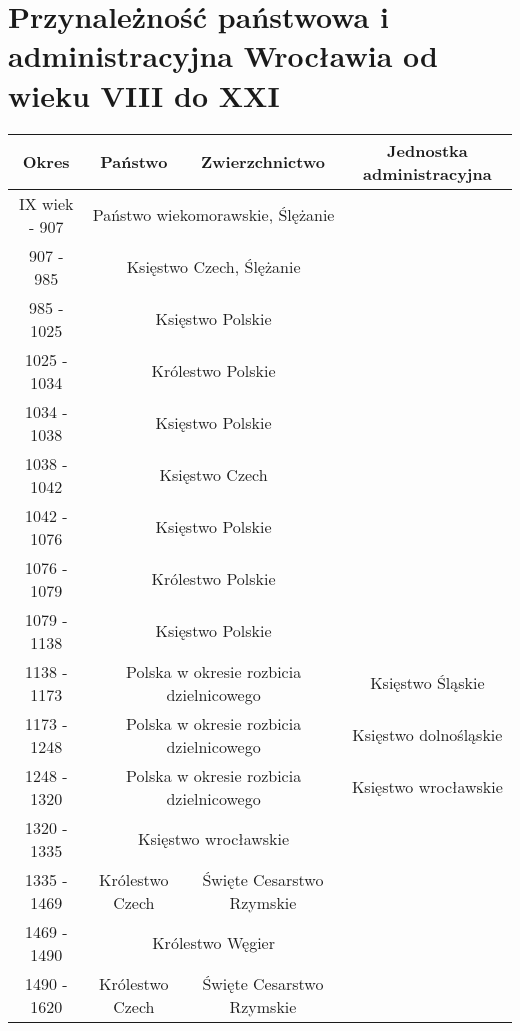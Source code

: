 \documentclass[12pt]{article}
\begin{document}
\section{Przynależność państwowa i administracyjna Wrocławia od wieku VIII do XXI}

\begin{center}
\begin{longtable}{|c|c|c|c|} 
\hline
\textbf{Okres} & \textbf{Państwo} & \textbf{Zwierzchnictwo} & \textbf{Jednostka administracyjna} \\
\hline
\cellcolor{LightCyan}IX wiek - 907 & \multicolumn{2}{c|}{Państwo wiekomorawskie, Ślężanie} & \\
\hline
\cellcolor{cyan}907 - 985 & \multicolumn{2}{c|}{Księstwo Czech, Ślężanie} & \\
\hline
\cellcolor{red}985 - 1025 & \multicolumn{2}{c|}{Księstwo Polskie} & \\
\hline
\cellcolor{red}1025 - 1034 & \multicolumn{2}{c|}{Królestwo Polskie} & \\
\hline
\cellcolor{red}1034 - 1038 & \multicolumn{2}{c|}{Księstwo Polskie} & \\
\hline
\cellcolor{cyan}1038 - 1042 & \multicolumn{2}{c|}{Księstwo Czech} & \\
\hline
\cellcolor{red}1042 - 1076 & \multicolumn{2}{c|}{Księstwo Polskie} & \\
\hline
\cellcolor{red}1076 - 1079 & \multicolumn{2}{c|}{Królestwo Polskie} & \\
\hline
\cellcolor{red}1079 - 1138 & \multicolumn{2}{c|}{Księstwo Polskie} & \\
\hline
\cellcolor{orange}1138 - 1173 & \multicolumn{2}{c|}{Polska w okresie rozbicia dzielnicowego} & Księstwo Śląskie \\
\hline
\cellcolor{orange}1173 - 1248 & \multicolumn{2}{c|}{Polska w okresie rozbicia dzielnicowego} & Księstwo dolnośląskie \\
\hline
\cellcolor{orange}1248 - 1320 & \multicolumn{2}{c|}{Polska w okresie rozbicia dzielnicowego} & Księstwo wrocławskie \\
\hline
\cellcolor{orange}1320 - 1335 & \multicolumn{2}{c|}{Księstwo wrocławskie} & \\
\hline
\cellcolor{cyan}1335 - 1469 & Królestwo Czech & Święte Cesarstwo  Rzymskie & \\
\hline
\cellcolor{green}1469 - 1490 & \multicolumn{2}{c|}{Królestwo Węgier} & \\
\hline
\cellcolor{cyan}1490 - 1620 & Królestwo Czech & Święte Cesarstwo Rzymskie & \\

\end{longtable}
\end{center}
\end{document}

